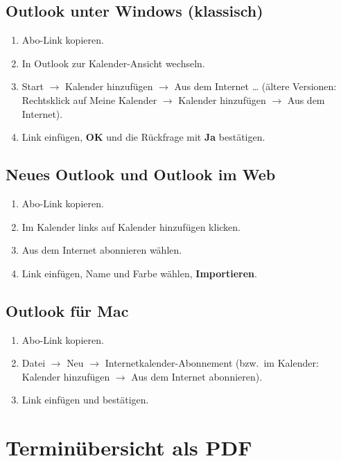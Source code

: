 \documentclass[a4paper,fontsize=10pt]{scrartcl}
\newcommand{\knopf}[1]{\textsf{\textbf{#1}}}
\newcommand{\menue}[1]{\textsf{#1}}
\begin{document}
\subsection*{Outlook unter Windows (klassisch)}
\begin{enumerate}
  \item Abo-Link kopieren.
  \item In Outlook zur \menue{Kalender}-Ansicht wechseln.
  \item \menue{Start} $\rightarrow$ \menue{Kalender hinzufügen}
        $\rightarrow$ \menue{Aus dem Internet \ldots} (ältere Versionen:
        Rechtsklick auf \menue{Meine Kalender} $\rightarrow$
        \menue{Kalender hinzufügen} $\rightarrow$ \menue{Aus dem Internet}).
  \item Link einfügen, \knopf{OK} und die Rückfrage mit \knopf{Ja} bestätigen.
\end{enumerate}

\subsection*{Neues Outlook und Outlook im Web}
\begin{enumerate}
  \item Abo-Link kopieren.
  \item Im Kalender links auf \menue{Kalender hinzufügen} klicken.
  \item \menue{Aus dem Internet abonnieren} wählen.
  \item Link einfügen, Name und Farbe wählen, \knopf{Importieren}.
\end{enumerate}

\subsection*{Outlook für Mac}
\begin{enumerate}
  \item Abo-Link kopieren.
  \item \menue{Datei} $\rightarrow$ \menue{Neu} $\rightarrow$
        \menue{Internetkalender-Abonnement} (bzw.\ im Kalender:
        \menue{Kalender hinzufügen} $\rightarrow$ \menue{Aus dem Internet
        abonnieren}).
  \item Link einfügen und bestätigen.
\end{enumerate}

\section{Terminübersicht als PDF}\label{sec:pdf}
\end{document}

